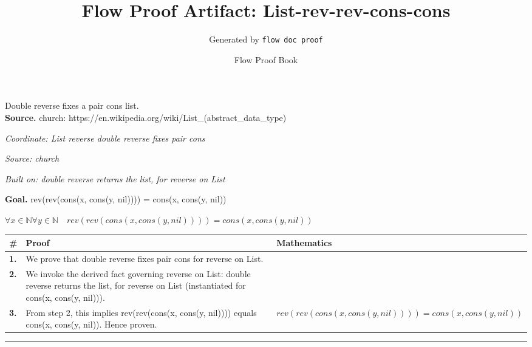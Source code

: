 \documentclass[11pt]{article}
\title{Flow Proof Artifact: List-rev-rev-cons-cons}
\author{Generated by \texttt{flow doc proof}}
\date{Flow Proof Book}
\theoremstyle{definition}
\begin{document}
\maketitle
Double reverse fixes a pair cons list.\\[0.5em]
\textbf{Source.} church: https://en.wikipedia.org/wiki/List\_(abstract\_data\_type)\\[0.5em]
\bigskip
{}\par
\smallskip\noindent\textit{Coordinate: List \cdot reverse \cdot double reverse fixes pair cons}\par
\smallskip\noindent\textit{Source: church}\par
\smallskip\noindent\textit{Built on: double reverse returns the list, for reverse on List}\par
\medskip
\noindent\textbf{Goal.} rev(rev(cons(x, cons(y, nil)))) = cons(x, cons(y, nil))\par
\noindent$\displaystyle \forall x \in \mathbb{N} \forall y \in \mathbb{N}\quad rev(rev(cons(x, cons(y, nil)))) = cons(x, cons(y, nil))$\par
\medskip
\noindent
\begin{tabular}{@{} >{\raggedright\arraybackslash}p{} >{\raggedright\arraybackslash}p{} >{\raggedleft\arraybackslash}p{} @{}}
\textbf{\#} & \textbf{Proof} & \textbf{Mathematics} \\
\midrule
\textbf{1.} & We prove that double reverse fixes pair cons for reverse on List. & \\[0.45em]
\textbf{2.} & We invoke the derived fact governing reverse on List: double reverse returns the list, for reverse on List (instantiated for cons(x, cons(y, nil))). & \\[0.45em]
\textbf{3.} & From step 2, this implies rev(rev(cons(x, cons(y, nil)))) equals cons(x, cons(y, nil)). Hence proven. & $\displaystyle rev(rev(cons(x, cons(y, nil)))) = cons(x, cons(y, nil))$ \\[0.45em]
\bottomrule
\end{tabular}
\label{thm:List-reverse-double_reverse_fixes_pair_cons}
\par\medskip\hrule
\end{document}
